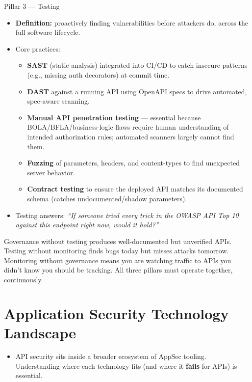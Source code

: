 \documentclass[11pt]{article}
\begin{document}
\begin{pillarbox}{Pillar 3 --- Testing}
\begin{itemize}
  \item \textbf{Definition:} proactively finding vulnerabilities before attackers do, across the full software lifecycle.
  \item Core practices:
  \begin{itemize}
    \item \textbf{SAST} (static analysis) integrated into CI/CD to catch insecure patterns (e.g., missing auth decorators) at commit time.
    \item \textbf{DAST} against a running API using OpenAPI specs to drive automated, spec-aware scanning.
    \item \textbf{Manual API penetration testing} --- essential because BOLA/BFLA/business-logic flaws require human understanding of intended authorization rules; automated scanners largely cannot find them.
    \item \textbf{Fuzzing} of parameters, headers, and content-types to find unexpected server behavior.
    \item \textbf{Contract testing} to ensure the deployed API matches its documented schema (catches undocumented/shadow parameters).
  \end{itemize}
  \item Testing answers: \textit{``If someone tried every trick in the OWASP API Top 10 against this endpoint right now, would it hold?''}
\end{itemize}
\end{pillarbox}

\begin{notebox}
Governance without testing produces well-documented but unverified APIs. Testing without monitoring finds bugs today but misses attacks tomorrow. Monitoring without governance means you are watching traffic to APIs you didn't know you should be tracking. All three pillars must operate together, continuously.
\end{notebox}

\newpage
\section{Application Security Technology Landscape}

\begin{itemize}
  \item API security sits inside a broader ecosystem of AppSec tooling. Understanding where each technology fits (and where it \textbf{fails} for APIs) is essential.
\end{itemize}
\end{document}
